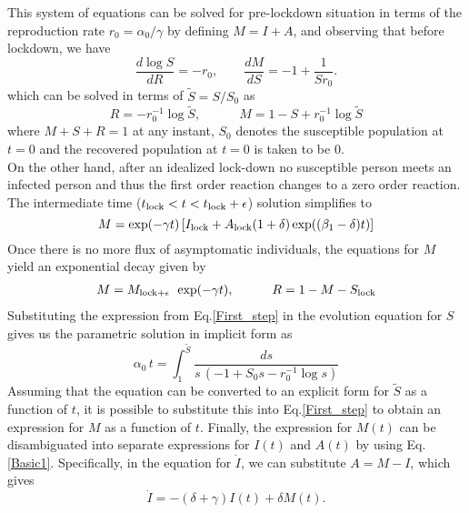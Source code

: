 \documentclass[aps,prl,reprint,superscriptaddress]{revtex4-1}
\begin{document}
	This system of equations can be solved for pre-lockdown  situation  in terms
	of the reproduction rate $r_0=\alpha_0/\gamma$ by defining $M = I+A$,
	and observing that before lockdown,  we have
	\begin{equation}
	\frac{d \log{S}}{dR} = -r_0, \qquad 
	\frac{d M}{d {S}}= -1+\frac{ 1 }{S r_0} .
	\end{equation}
	which  can be solved  in terms of $\tilde{S}=S/S_0$ as
	\begin{equation}
	\label{First_step}
	R = - r_0^{-1} \log{\tilde{S}}, \qquad \quad
	M=1-S+r_0^{-1}\log{\tilde{S}}
	\end{equation}
	where $M+S+R=1$ at any instant, $S_0$ denotes the susceptible population at
	$t=0$ and the recovered population at $t=0$ is taken to be $0$.
	\\
	On the other hand, after an idealized lock-down no susceptible
	person meets an infected person and thus the first order reaction changes to
	a zero order reaction.
	The intermediate time ($t_{\rm lock}<t<t_{\rm lock} + \epsilon$) solution  simplifies to
	\begin{equation}
	M = \exp(-\gamma t ) \left[  I_{\rm lock} + A_{ \rm lock} (1 + \delta) \exp ((\beta_1-\delta)t )  \right]
	\end{equation}
	Once there is no more flux of asymptomatic individuals, the equations for $M$ yield an exponential decay given by
	\begin{align}
	\label{recovery_rate_post_lock}
	M = M_{\rm lock + \epsilon}\> \> \exp(-\gamma t), \qquad \quad 	
	R = 1 - M - S_{\rm lock}
	\end{align}
	Substituting the expression from Eq.\eqref{First_step}  in the evolution equation for $S$ 
	gives us the parametric solution in implicit form as
	\begin{equation}
	\label{implicit}
	\alpha_0\, t= \int_{1}^{\tilde{S}}\frac{d s}{ s  \, \left(-1+S_0 s- r_0^{-1}
		\log{s}\right) } 
	\end{equation}
	Assuming that the equation can be converted to an explicit form for
	$\tilde{S}$ as a function of $t$, it is possible to substitute this into
	Eq.\eqref{First_step} to obtain an expression for $M$ as a function of $t$.
	Finally, the expression for $M(t)$ can be disambiguated into separate
	expressions for $I(t)$ and $A(t)$ by using Eq.\eqref{Basic1}.
	Specifically, in the equation for $\dot{I}$, we can substitute $A = M-I$,
	which gives
	\begin{displaymath}
	\dot{I} = - \left( \delta + \gamma \right) I(t)
	+ \delta M(t) .
	\end{displaymath}
\end{document}
